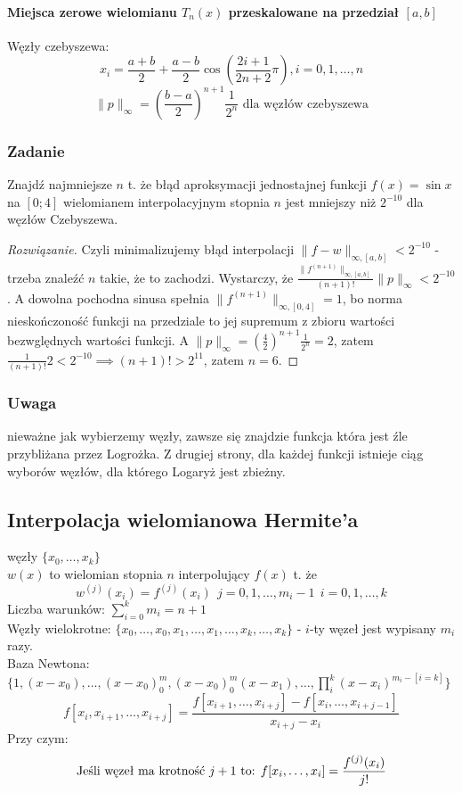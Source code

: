 \documentclass{article}
\begin{document}
\paragraph{Miejsca zerowe wielomianu $ T_n(x) $ przeskalowane na przedział $ [a,b] $}
Węzły czebyszewa:
$$x_i=\frac{a+b}{2}+\frac{a-b}{2}\cos(\frac{2i+1}{2n+2}\pi), i=0,1,\dots,n$$
$$\|p\|_\infty = (\frac{b-a}{2})^{n+1}\frac{1}{2^n}\text{ dla węzłów czebyszewa}$$
\subsubsection{Zadanie}
Znajdź najmniejsze $ n $ t. że błąd aproksymacji jednostajnej funkcji $ f(x)=\sin x $ na $ [0;4] $ wielomianem interpolacyjnym stopnia $ n $ jest mniejszy niż $ 2^{-10} $ dla węzłów Czebyszewa.
\begin{proof}[Rozwiązanie]
	Czyli minimalizujemy błąd interpolacji $ \|f-w\|_{\infty, [a,b]}<2^{-10} $ - trzeba znaleźć $ n $ takie, że to zachodzi. Wystarczy, że $ \frac{\|f^{(n+1)}\|_{\infty, [a,b]}}{(n+1)!}\|p\|_\infty <2^{-10} $. A dowolna pochodna sinusa spełnia $ \|f^{(n+1)}\|_{\infty, [0,4]}=1 $, bo norma nieskończoność funkcji na przedziale to jej supremum z zbioru wartości bezwględnych wartości funkcji. A $ \|p\|_\infty=(\frac42)^{n+1}\frac{1}{2^n}=2 $, zatem $ \frac{1}{(n+1)!}2<2^{-10}  \implies (n+1)!>2^{11} $, zatem $ n=6 $.
\end{proof}
\subsubsection{Uwaga}
nieważne jak wybierzemy węzły, zawsze się znajdzie funkcja która jest źle przybliżana przez Logrożka. Z drugiej strony, dla każdej funkcji istnieje ciąg wyborów węzłów, dla którego Logaryż jest zbieżny.
\subsection{Interpolacja wielomianowa Hermite'a}
węzły $ \{x_0, \dots, x_k\} $\\
$ w(x) $ to wielomian stopnia $ n $ interpolujący $ f(x) $ t. że 
$$ w^{(j)}(x_i)=f^{(j)}(x_i)\ \ j=0,1,\dots,m_i-1\ \ i=0,1,\dots, k $$
Liczba warunków: $ \sum_{i=0}^km_i=n+1 $\\
Węzły wielokrotne: $ \{x_0, \dots, x_0, x_1, \dots, x_1, \dots, x_k, \dots, x_k\} $ - $ i $-ty węzeł jest wypisany $ m_i $ razy.\\
Baza Newtona: $\{1, (x-x_0), \dots, (x-x_0)^m_0, (x-x_0)^m_0(x-x_1), \dots, \prod_{i}^{k}(x-x_i)^{m_i - [i=k]}\}$
$$f[x_i, x_{i+1}, \dots, x_{i+j}]=\frac{f[x_{i+1},\dots, x_{i+j}]-f[x_i, \dots, x_{i+j-1}]}{x_{i+j}-x_i}$$
Przy czym:
$$\text{Jeśli węzeł ma krotność $ j+1 $ to: }f[x_i, \dots, x_i]=\frac{f^{(j)}(x_i)}{j!}$$
\end{document}
